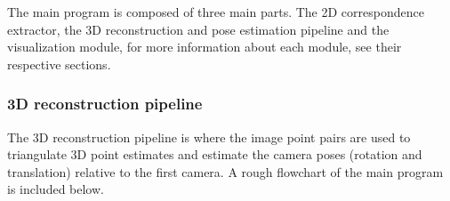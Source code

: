 The main program is composed of three main parts. The 2D correspondence extractor, the 3D reconstruction and pose estimation pipeline and the visualization module, for more information about each module, see their respective sections.


\subsubsection{3D reconstruction pipeline}
The 3D reconstruction pipeline is where the image point pairs are used to triangulate 3D point estimates and estimate the camera poses (rotation and translation) relative to the first camera. A rough flowchart of the main program is included below.

